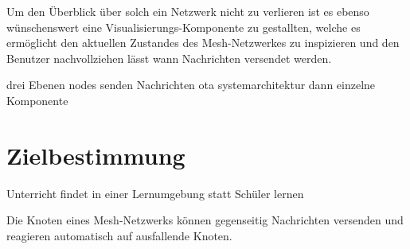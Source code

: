 Um den Überblick über solch ein Netzwerk nicht zu verlieren ist es ebenso wünschenswert eine Visualisierungs-Komponente zu gestallten, welche es ermöglicht den aktuellen Zustandes des Mesh-Netzwerkes zu inspizieren und den Benutzer nachvollziehen lässt wann Nachrichten versendet werden.

drei Ebenen
nodes senden Nachrichten
ota
systemarchitektur
dann einzelne Komponente

\section{Zielbestimmung}
Unterricht findet in einer Lernumgebung statt
Schüler lernen

Die Knoten eines Mesh-Netzwerks können gegenseitig Nachrichten versenden und reagieren automatisch auf ausfallende Knoten.